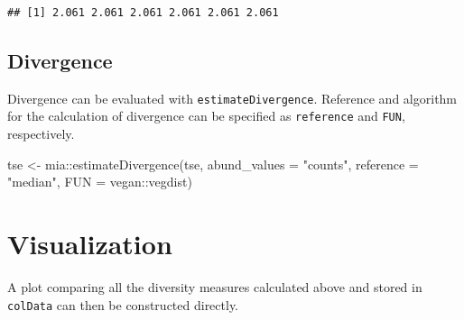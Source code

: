 \documentclass[
]{book}
\newenvironment{Shaded}{\begin{snugshade}}{\end{snugshade}}
\newcommand{\AttributeTok}[1]{\textcolor[rgb]{0.77,0.63,0.00}{#1}}
\newcommand{\FunctionTok}[1]{\textcolor[rgb]{0.00,0.00,0.00}{#1}}
\newcommand{\NormalTok}[1]{#1}
\newcommand{\OtherTok}[1]{\textcolor[rgb]{0.56,0.35,0.01}{#1}}
\newcommand{\SpecialCharTok}[1]{\textcolor[rgb]{0.00,0.00,0.00}{#1}}
\newcommand{\StringTok}[1]{\textcolor[rgb]{0.31,0.60,0.02}{#1}}
\begin{document}
\begin{verbatim}
## [1] 2.061 2.061 2.061 2.061 2.061 2.061
\end{verbatim}

\hypertarget{divergence}{%
\subsection{Divergence}\label{divergence}}

Divergence can be evaluated with \texttt{estimateDivergence}. Reference and algorithm for the calculation of divergence can be specified as \texttt{reference} and \texttt{FUN}, respectively.

\begin{Shaded}
\begin{Highlighting}[]
\NormalTok{tse }\OtherTok{\textless{}{-}}\NormalTok{ mia}\SpecialCharTok{::}\FunctionTok{estimateDivergence}\NormalTok{(tse,}
                               \AttributeTok{abund\_values =} \StringTok{"counts"}\NormalTok{,}
                               \AttributeTok{reference =} \StringTok{"median"}\NormalTok{,}
                               \AttributeTok{FUN =}\NormalTok{ vegan}\SpecialCharTok{::}\NormalTok{vegdist)}
\end{Highlighting}
\end{Shaded}

\hypertarget{visualization}{%
\section{Visualization}\label{visualization}}

A plot comparing all the diversity measures calculated above and stored in \texttt{colData} can then be constructed directly.
\end{document}
